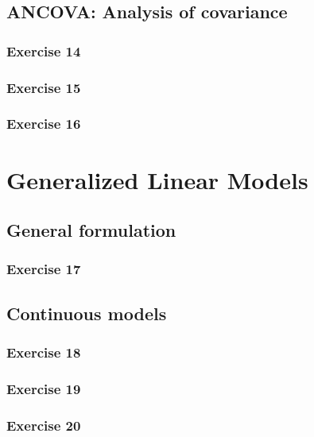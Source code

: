 \documentclass[english,]{article}
\begin{document}
\subsection{ANCOVA: Analysis of
covariance}\label{ancova-analysis-of-covariance}

\subsubsection{Exercise 14}\label{exercise-14}

\subsubsection{Exercise 15}\label{exercise-15}

\subsubsection{Exercise 16}\label{exercise-16}

\section{Generalized Linear Models}\label{generalized-linear-models}

\subsection{General formulation}\label{general-formulation}

\subsubsection{Exercise 17}\label{exercise-17}

\subsection{Continuous models}\label{continuous-models}

\subsubsection{Exercise 18}\label{exercise-18}

\subsubsection{Exercise 19}\label{exercise-19}

\subsubsection{Exercise 20}\label{exercise-20}
\end{document}
